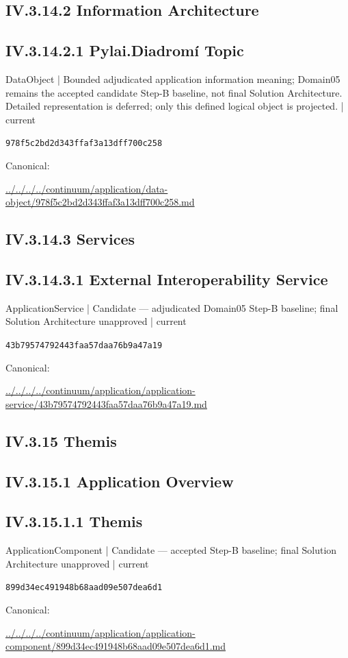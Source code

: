 \documentclass[10pt,a4paper]{article}
\begin{document}
\subsection*{IV.3.14.2 Information Architecture}
\subsection*{IV.3.14.2.1 Pylai.Diadromí Topic}
\label{element-978f5c2bd2d343ffaf3a13dff700c258}
{\small DataObject | Bounded adjudicated application information meaning; Domain05 remains the accepted candidate Step-B baseline, not final Solution Architecture. Detailed representation is deferred; only this defined logical object is projected. | current}\par
\texttt{978f5c2bd2d343ffaf3a13dff700c258}\par
Canonical: \par
{\footnotesize\url{../../../../continuum/application/data-object/978f5c2bd2d343ffaf3a13dff700c258.md}}\par
\subsection*{IV.3.14.3 Services}
\subsection*{IV.3.14.3.1 External Interoperability Service}
\label{element-43b79574792443faa57daa76b9a47a19}
{\small ApplicationService | Candidate — adjudicated Domain05 Step-B baseline; final Solution Architecture unapproved | current}\par
\texttt{43b79574792443faa57daa76b9a47a19}\par
Canonical: \par
{\footnotesize\url{../../../../continuum/application/application-service/43b79574792443faa57daa76b9a47a19.md}}\par
\subsection*{IV.3.15 Themis}
\subsection*{IV.3.15.1 Application Overview}
\subsection*{IV.3.15.1.1 Themis}
\label{element-899d34ec491948b68aad09e507dea6d1}
{\small ApplicationComponent | Candidate — accepted Step-B baseline; final Solution Architecture unapproved | current}\par
\texttt{899d34ec491948b68aad09e507dea6d1}\par
Canonical: \par
{\footnotesize\url{../../../../continuum/application/application-component/899d34ec491948b68aad09e507dea6d1.md}}\par
\end{document}
